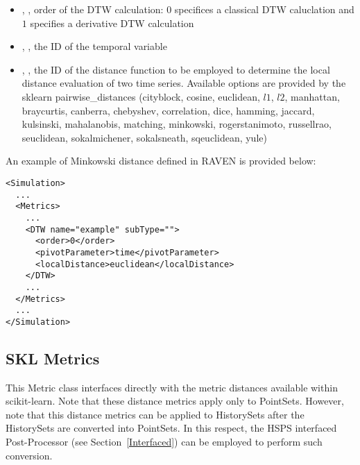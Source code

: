 \begin{itemize}
  \item {},          ,    order of the DTW calculation: $0$ specifices a classical DTW caluclation and $1$ specifies
                                                                    a derivative DTW calculation
  \item {}, , the ID of the temporal variable
  \item {},  , the ID of the distance function to be employed to determine the local distance
                                                                    evaluation of two time series. Available options are provided by the sklearn
                                                                    pairwise\_distances (cityblock, cosine, euclidean, $l1$, $l2$, manhattan,
                                                                    braycurtis, canberra, chebyshev, correlation, dice, hamming, jaccard,
                                                                    kulsinski, mahalanobis, matching, minkowski, rogerstanimoto, russellrao,
                                                                    seuclidean, sokalmichener, sokalsneath, sqeuclidean, yule)
\end{itemize}

An example of Minkowski distance defined in RAVEN is provided below:
\begin{lstlisting}[style=XML]
<Simulation>
  ...
  <Metrics>
    ...
    <DTW name="example" subType="">
      <order>0</order>
      <pivotParameter>time</pivotParameter>
      <localDistance>euclidean</localDistance>
    </DTW>
    ...
  </Metrics>
  ...
</Simulation>
\end{lstlisting}

\subsection{SKL Metrics}
\label{subsection:SKL_metrics}

This Metric class interfaces directly with the metric distances available within scikit-learn.
Note that these distance metrics apply only to PointSets. However, note that this distance metrics can be applied to HistorySets after the HistorySets are converted into PointSets.
In this respect, the HSPS interfaced Post-Processor (see Section~\ref{Interfaced}) can be employed to perform such conversion.

